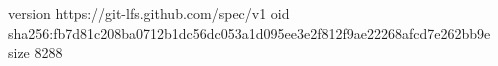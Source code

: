version https://git-lfs.github.com/spec/v1
oid sha256:fb7d81c208ba0712b1dc56dc053a1d095ee3e2f812f9ae22268afcd7e262bb9e
size 8288
